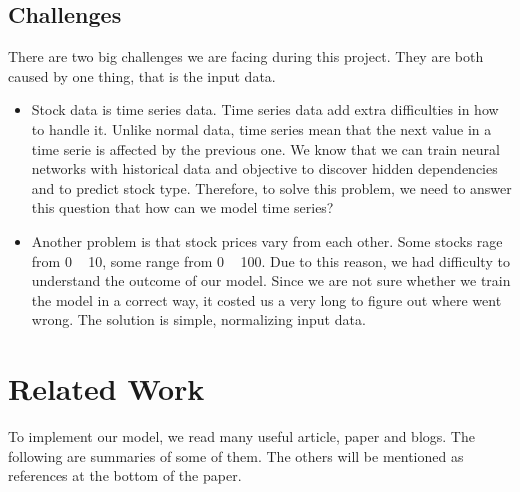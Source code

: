 \documentclass[12pt]{article}
\begin{document}
\subsection{Challenges}
There are two big challenges we are facing during this project. They are both caused by one thing,
that is the input data.

\begin{itemize}
\item Stock data is time series data. Time series data add extra
difficulties in how to handle it. Unlike normal data, time series mean that the next
value in a time serie is affected by the previous one. We know that we can train
neural networks with historical data and objective to discover hidden dependencies and
to predict stock type. Therefore, to solve this problem, we need to answer this question
that how can we model time series?
\item Another problem is that stock prices vary from each other. Some stocks rage from
0 ~ 10, some range from 0 ~ 100. Due to this reason, we had difficulty to understand the outcome
of our model. Since we are not sure whether we train the model in a correct way, it costed us a very
long to figure out where went wrong. The solution is simple, normalizing input data.
\end{itemize}


\section{Related Work}
To implement our model, we read many useful article, paper and blogs. The following are
summaries of some of them. The others will be mentioned as references at the bottom of the paper.
\end{document}
